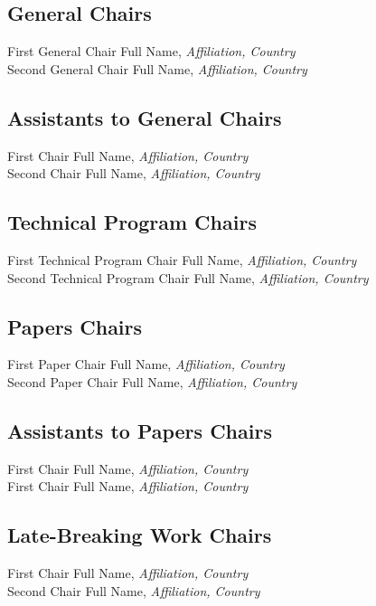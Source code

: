 
\subsection{General Chairs}
First General Chair Full Name, \emph{Affiliation, Country}\\
Second General Chair Full Name, \emph{Affiliation, Country}\\

\subsection{Assistants to General Chairs}
First Chair Full Name, \emph{Affiliation, Country}\\
Second Chair Full Name, \emph{Affiliation, Country}\\

\subsection{Technical Program Chairs}
First Technical Program Chair Full Name, \emph{Affiliation, Country}\\
Second Technical Program Chair Full Name, \emph{Affiliation, Country}\\

\subsection{Papers Chairs}
First Paper Chair Full Name, \emph{Affiliation, Country}\\
Second Paper Chair Full Name, \emph{Affiliation, Country}\\

\subsection{Assistants to Papers Chairs}
First Chair Full Name, \emph{Affiliation, Country}\\
First Chair Full Name, \emph{Affiliation, Country}\\

\subsection{Late-Breaking Work Chairs}
First Chair Full Name, \emph{Affiliation, Country}\\
Second Chair Full Name, \emph{Affiliation, Country}\\

